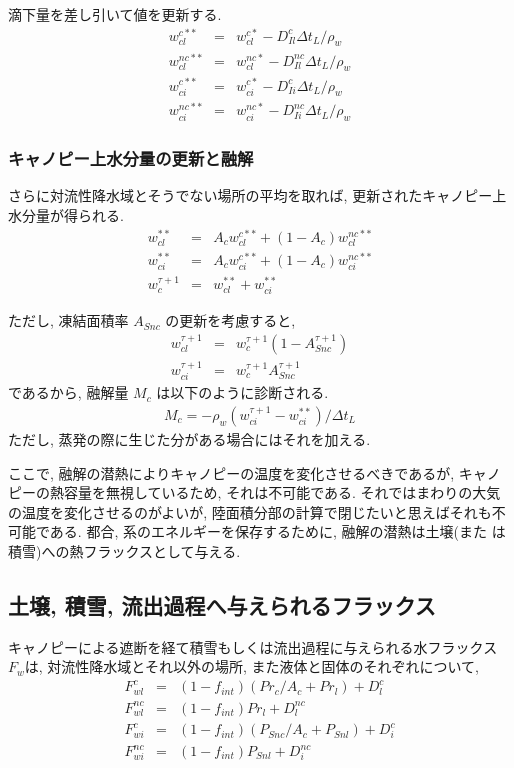滴下量を差し引いて値を更新する.
\begin{eqnarray}
 w_{cl}^{c**} &=& w_{cl}^{c*}  - D_{Il}^c    \Delta t_L / \rho_w \\
 w_{cl}^{nc**}&=& w_{cl}^{nc*} - D_{Il}^{nc} \Delta t_L / \rho_w \\
 w_{ci}^{c**} &=& w_{ci}^{c*}  - D_{Ii}^c    \Delta t_L / \rho_w \\
 w_{ci}^{nc**}&=& w_{ci}^{nc*} - D_{Ii}^{nc} \Delta t_L / \rho_w
\end{eqnarray}

\subsubsection{キャノピー上水分量の更新と融解}

さらに対流性降水域とそうでない場所の平均を取れば, 更新されたキャノピー上
水分量が得られる.
\begin{eqnarray}
 w_{cl}^{**} &=& A_c w_{cl}^{c**} + (1-A_c) w_{cl}^{nc**} \\
 w_{ci}^{**} &=& A_c w_{ci}^{c**} + (1-A_c) w_{ci}^{nc**} \\
 w_c^{\tau+1} &=& w_{cl}^{**} + w_{ci}^{**}
\end{eqnarray}

ただし, 凍結面積率 $A_{Snc}$ の更新を考慮すると,
\begin{eqnarray}
 w_{cl}^{\tau+1} &=& w_{c}^{\tau+1} (1-A_{Snc}^{\tau+1}) \\
 w_{ci}^{\tau+1} &=& w_{c}^{\tau+1} A_{Snc}^{\tau+1}
\end{eqnarray}
であるから, 融解量 $M_c$ は以下のように診断される.
\begin{eqnarray}
 M_c = - \rho_w ( w_{ci}^{\tau+1} - w_{ci}^{**} ) / \Delta t_L
\end{eqnarray}
ただし, 蒸発の際に生じた分がある場合にはそれを加える.

ここで, 融解の潜熱によりキャノピーの温度を変化させるべきであるが, キャノ
ピーの熱容量を無視しているため, それは不可能である. それではまわりの大気
の温度を変化させるのがよいが, 陸面積分部の計算で閉じたいと思えばそれも不
可能である. 都合, 系のエネルギーを保存するために, 融解の潜熱は土壌(また
は積雪)への熱フラックスとして与える.

\subsection{土壌, 積雪, 流出過程へ与えられるフラックス}

キャノピーによる遮断を経て積雪もしくは流出過程に与えられる水フラックス
$F_w$は, 対流性降水域とそれ以外の場所, また液体と固体のそれぞれについて,
\begin{eqnarray}
 F_{wl}^{c} &=& (1-f_{int})( Pr_c / A_c + Pr_l ) + D_{l}^{c} \\
 F_{wl}^{nc} &=&(1-f_{int}) Pr_l + D_{l}^{nc} \\
 F_{wi}^{c} &=& (1-f_{int})( P_{Snc} / A_c + P_{Snl} ) + D_{i}^{c} \\
 F_{wi}^{nc} &=&(1-f_{int}) P_{Snl} + D_{i}^{nc}
\end{eqnarray}

